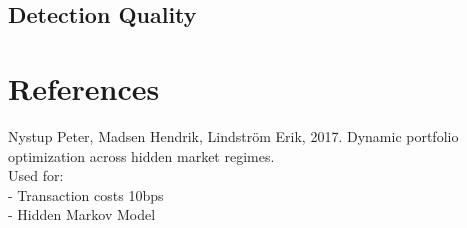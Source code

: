 \documentclass[12pt]{article}
\begin{document}
\begin{figure}[htbp]
    \label{fig:scatter_crisis_excess}
\end{figure}
\FloatBarrier


\subsection{Detection Quality}

\FloatBarrier




\newpage
\section{References}

Nystup Peter, Madsen Hendrik, Lindström Erik, 2017. Dynamic portfolio optimization across hidden market regimes.\\ 
Used for:\\
    - Transaction costs 10bps\\
    - Hidden Markov Model\\




    
\end{document}
